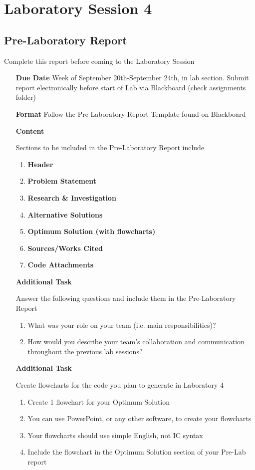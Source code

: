 \documentclass[]{report}
\begin{document}
\chapter{Laboratory Session 4}
\section{Pre-Laboratory Report}
Complete this report before coming to the Laboratory Session
\begin{itemize}
	\item[\textbf{Due Date}]{Week of September 20th-September 24th, \the\year \space in lab section. Submit report electronically before start of Lab via Blackboard (check assignments folder)}
	\item[\textbf{Format}]{Follow the Pre-Laboratory Report Template found on Blackboard}
	\item[\textbf{Content}]{Sections to be included in the Pre-Laboratory Report include
		\begin{enumerate}
			\item \textbf{Header}
			\item \textbf{Problem Statement}
			\item \textbf{Research \& Investigation}
			\item \textbf{Alternative Solutions}
			\item \textbf{Optimum Solution (with flowcharts)}
			\item \textbf{Sources/Works Cited}
			\item \textbf{Code Attachments}
		\end{enumerate}
		
	}
	\item[\textbf{Additional Task}]{Answer the following questions and include them in the Pre-Laboratory Report
		\begin{enumerate}[label=\alph*.]
			\item What was your role on your team (i.e. main responsibilities)? 
			\item How would you describe your team’s collaboration and communication throughout the previous lab sessions? 
		\end{enumerate}	
	}
	
	\item[\textbf{Additional Task}]{Create flowcharts for the code you plan to generate in Laboratory 4
		\begin{enumerate}[label=\alph*.]
			\item Create 1 flowchart for your Optimum Solution
			\item You can use PowerPoint, or any other software, to create your flowcharts
			\item Your flowcharts should use simple English, not IC syntax
			\item Include the flowchart in the Optimum Solution section of your Pre-Lab report
		\end{enumerate}
		
	}
\end{itemize}
\end{document}
